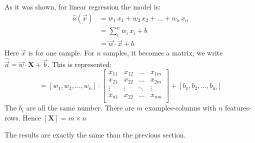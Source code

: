 As it was shown, for linear regression the model is:
\begin{align*}
  \hat{a}(\vec{x}) &= w_1\,x_1 + w_2\,x_2 +\ldots+ w_n\,x_n\\
   &= \sum_i^n w_i\, x_i + b \\
   &= \vec{w}\cdot\vec{x} + b
\end{align*}
Here $\vec{x}$ is for one sample. For $n$ samples, it becomes a matrix, we write $\hat{\vec{a}} = \vec{w}\cdot\mathbf{X} + \vec{b}$. This is represented:
\begin{equation*}
  [a_1, a_2, \ldots, a_n] = 
  [w_1, w_2, \ldots, w_n] \cdot
  \begin{bmatrix}
    x_{11} & x_{12} & \ldots & x_{1m}\\
    x_{21} & x_{22} & \ldots & x_{2m}\\
    \vdots & \vdots & \ddots & \vdots\\
    x_{n1} & x_{22} & \ldots & x_{nm}\\
  \end{bmatrix}
  + [b_1, b_2, \ldots, b_m]
\end{equation*}
The $b_i$ are all the same number. There are $m$ examples-columns with $n$ features-rows. Hence $[\mathbf{X}] = m\times{}n$

The results are exactly the same than the previous section.
